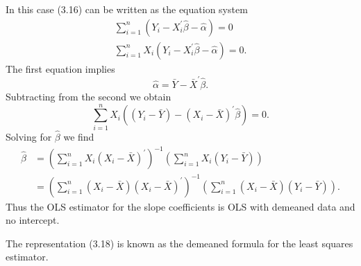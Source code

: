 \documentclass[10pt]{article}
\begin{document}
In this case (3.16) can be written as the equation system
$$
\begin{array}{r}
\sum_{i=1}^{n}\left(Y_{i}-X_{i}^{\prime} \widehat{\beta}-\widehat{\alpha}\right)=0 \\
\sum_{i=1}^{n} X_{i}\left(Y_{i}-X_{i}^{\prime} \widehat{\beta}-\widehat{\alpha}\right)=0 .
\end{array}
$$
The first equation implies
$$
\widehat{\alpha}=\bar{Y}-\bar{X}^{\prime} \widehat{\beta} .
$$
Subtracting from the second we obtain
$$
\sum_{i=1}^{n} X_{i}\left(\left(Y_{i}-\bar{Y}\right)-\left(X_{i}-\bar{X}\right)^{\prime} \widehat{\beta}\right)=0 .
$$
Solving for $\widehat{\beta}$ we find
$$
\begin{aligned}
\widehat{\beta} &=\left(\sum_{i=1}^{n} X_{i}\left(X_{i}-\bar{X}\right)^{\prime}\right)^{-1}\left(\sum_{i=1}^{n} X_{i}\left(Y_{i}-\bar{Y}\right)\right) \\
&=\left(\sum_{i=1}^{n}\left(X_{i}-\bar{X}\right)\left(X_{i}-\bar{X}\right)^{\prime}\right)^{-1}\left(\sum_{i=1}^{n}\left(X_{i}-\bar{X}\right)\left(Y_{i}-\bar{Y}\right)\right) .
\end{aligned}
$$
Thus the OLS estimator for the slope coefficients is OLS with demeaned data and no intercept.

The representation (3.18) is known as the demeaned formula for the least squares estimator.
\end{document}
